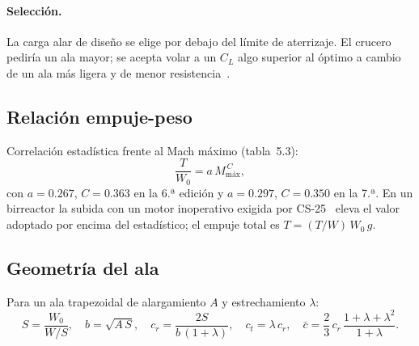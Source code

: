 \documentclass[11pt,a4paper]{article}
\newcommand{\WO}{W_0}
\begin{document}
\paragraph{Selección.} La carga alar de diseño se elige por debajo del límite
de aterrizaje. El crucero pediría un ala mayor; se acepta volar a un $C_L$
algo superior al óptimo a cambio de un ala más ligera y de menor
resistencia~\cite{guion}.

\subsection{Relación empuje-peso}
Correlación estadística frente al Mach máximo (tabla~5.3):
\begin{equation}
  \frac{T}{\WO} = a\,M_\text{máx}^{\,C},
\end{equation}
con $a=\num{0.267}$, $C=\num{0.363}$ en la 6.ª edición y $a=\num{0.297}$,
$C=\num{0.350}$ en la 7.ª. En un birreactor la subida con un motor inoperativo
exigida por CS-25~\cite{cs25} eleva el valor adoptado por encima del
estadístico; el empuje total es $T = (T/W)\,\WO\,g$.

\subsection{Geometría del ala}
Para un ala trapezoidal de alargamiento $A$ y estrechamiento $\lambda$:
\begin{equation}
  S = \frac{\WO}{W/S}, \quad
  b = \sqrt{A\,S}, \quad
  c_r = \frac{2S}{b\,(1+\lambda)}, \quad
  c_t = \lambda\,c_r, \quad
  \bar{c} = \frac{2}{3}\,c_r\,\frac{1+\lambda+\lambda^2}{1+\lambda}.
\end{equation}
\end{document}
